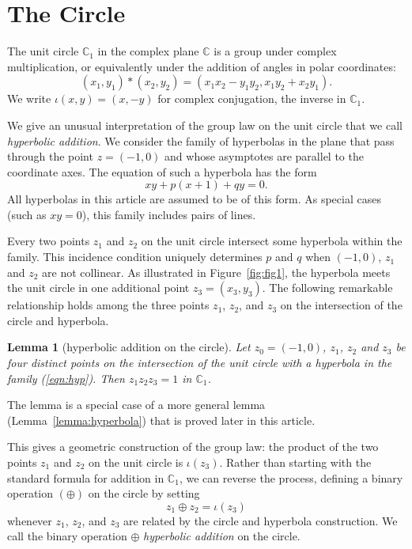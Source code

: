 \documentclass[12pt]{article}
\newtheorem{lemma}[theorem]{Lemma}
\newcommand{\ring}[1]{\mathbb{#1}}
\begin{document}
\section{The Circle}

The unit circle $\ring{C}_1$ in the complex plane $\ring{C}$ is a
group under complex multiplication, or equivalently under the addition
of angles in polar coordinates:
\begin{equation}\label{eqn:cx}
(x_1,y_1) * (x_2,y_2) = (x_1 x_2 - y_1 y_2,x_1 y_2 + x_2 y_1).
\end{equation}
We write $\iota(x,y) = (x,-y)$ for complex conjugation, the inverse in
$\ring{C}_1$.

We give an unusual interpretation of the group law on the unit circle
that we call {\it hyperbolic addition}.  We consider the family of
hyperbolas in the plane that pass through the point $z=(-1,0)$ and
whose asymptotes are parallel to the coordinate axes.  The equation of
such a hyperbola has the form
\begin{equation}\label{eqn:hyp}
x y + p (x+1) + q y = 0.
\end{equation}
All hyperbolas in this article are assumed to be of this form.  As
special cases (such as $x y=0$), this family includes pairs of lines.
 
Every two points $z_1$ and $z_2$ on the unit circle intersect some
hyperbola within the family.  This incidence condition uniquely
determines $p$ and $q$ when $(-1,0)$, $z_1$ and $z_2$ are not
collinear.  As illustrated in Figure~\ref{fig:fig1}, the hyperbola
meets the unit circle in one additional point $z_3 = (x_3,y_3)$.  The
following remarkable relationship holds among the three points $z_1$,
$z_2$, and $z_3$ on the intersection of the circle and hyperbola.

\begin{lemma}[hyperbolic addition on the circle] \label{lemma:ha} Let
  $z_0=(-1,0)$, $z_1$, $z_2$ and $z_3$ be four distinct points on the
  intersection of the unit circle with a hyperbola in the family (\ref{eqn:hyp}).  
  Then $z_1 z_2 z_3 = 1$ in $\ring{C}_1$.
\end{lemma}

The lemma is a special case of a more general lemma
(Lemma~\ref{lemma:hyperbola}) that is proved later in this article.

This gives a geometric construction of the group law: the product of
the two points $z_1$ and $z_2$ on the unit circle is $\iota(z_3)$.
Rather than starting with the standard formula for addition in
$\ring{C}_1$, we can reverse the process, defining a binary operation
$(\oplus)$ on the circle by setting
\[
z_1 \oplus z_2 = \iota(z_3)
\]
whenever $z_1$, $z_2$, and $z_3$ are related by the circle and
hyperbola construction.  We call the binary operation $\oplus$ {\it
  hyperbolic addition} on the circle.
\end{document}
